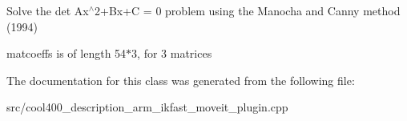 Solve the det Ax$^\wedge$2+\-Bx+\-C = 0 problem using the Manocha and Canny method (1994) 

matcoeffs is of length 54$\ast$3, for 3 matrices 

The documentation for this class was generated from the following file\-:\begin{DoxyCompactItemize}
\item 
src/cool400\-\_\-description\-\_\-arm\-\_\-ikfast\-\_\-moveit\-\_\-plugin.\-cpp\end{DoxyCompactItemize}
